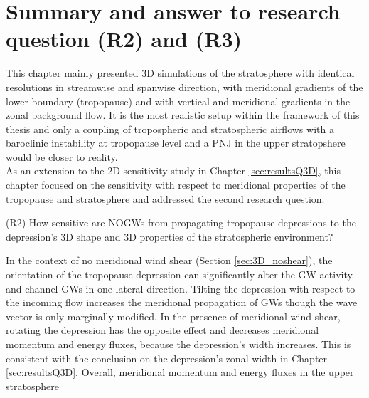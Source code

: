 
\section{Summary and answer to research question (R2) and (R3)}
\label{sec:3D_summary}
This chapter mainly presented 3D simulations of the stratosphere with identical resolutions in streamwise and spanwise direction, with meridional gradients of the lower boundary (tropopause) and with vertical and meridional gradients in the zonal background flow. It is the most realistic setup within the framework of this thesis and only a coupling of tropospheric and stratospheric airflows with a baroclinic instability at tropopause level and a PNJ in the upper stratopshere would be closer to reality. \\
As an extension to the 2D sensitivity study in Chapter \ref{sec:resultsQ3D}, this chapter focused on the sensitivity with respect to meridional properties of the tropopause and stratosphere and addressed the second research question.
\begin{tcolorbox}[]
    (R2) How sensitive are NOGWs from propagating tropopause depressions to the depression's 3D shape and 3D properties of the stratospheric environment?
\end{tcolorbox}
In the context of no meridional wind shear (Section \ref{sec:3D_noshear}), the orientation of the tropopause depression can significantly alter the GW activity and channel GWs in one lateral direction. Tilting the depression with respect to the incoming flow increases the meridional propagation of GWs though the wave vector is only marginally modified. In the presence of meridional wind shear, rotating the depression has the opposite effect and decreases meridional momentum and energy fluxes, because the depression's width increases. This is consistent with the conclusion on the depression's zonal width in Chapter \ref{sec:resultsQ3D}. Overall, meridional momentum and energy fluxes in the upper stratosphere
